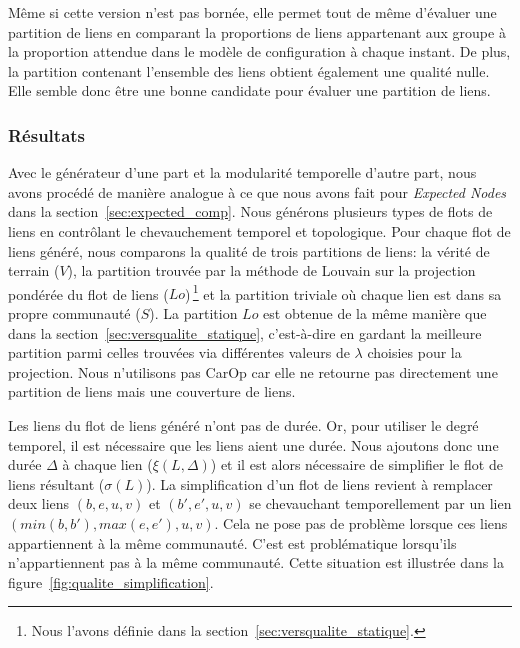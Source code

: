  

Même si cette version n'est pas bornée, elle permet tout de même d'évaluer une partition de liens en comparant la proportions de liens appartenant aux groupe à la proportion attendue dans le modèle de configuration à chaque instant.
De plus, la partition contenant l'ensemble des liens obtient également une qualité nulle.
Elle semble donc être une bonne candidate pour évaluer une partition de liens.

\subsubsection{Résultats}

Avec le générateur d'une part et la modularité temporelle d'autre part, nous avons procédé de manière analogue à ce que nous avons fait pour \emph{Expected Nodes} dans la section~\ref{sec:expected_comp}.
Nous générons plusieurs types de flots de liens en contrôlant le chevauchement temporel et topologique.
Pour chaque flot de liens généré, nous comparons la qualité de trois partitions de liens: la vérité de terrain ($V$), la partition trouvée par la méthode de Louvain sur la projection pondérée du flot de liens ($Lo$)\,\footnote{Nous l'avons définie dans la section~\ref{sec:versqualite_statique}.} et la partition triviale où chaque lien est dans sa propre communauté ($S$).
La partition $Lo$ est obtenue de la même manière que dans la section~\ref{sec:versqualite_statique}, c'est-à-dire en gardant la meilleure partition parmi celles trouvées via différentes valeurs de $\lambda$ choisies pour la projection.
Nous n'utilisons pas CarOp car elle ne retourne pas directement une partition de liens mais une couverture de liens.

Les liens du flot de liens généré n'ont pas de durée.
Or, pour utiliser le degré temporel, il est nécessaire que les liens aient une durée.
Nous ajoutons donc une durée $\Delta$ à chaque lien ($\xi(L,\Delta)$) et il est alors nécessaire de simplifier le flot de liens résultant ($\sigma(L)$).
La simplification d'un flot de liens revient à remplacer deux liens $(b,e,u,v)$ et $(b',e',u,v)$ se chevauchant temporellement par un lien $(min(b,b'),max(e,e'),u,v)$.
Cela ne pose pas de problème lorsque ces liens appartiennent à la même communauté.
C'est est problématique lorsqu'ils n'appartiennent pas à la même communauté.
Cette situation est illustrée dans la figure~\ref{fig:qualite_simplification}.

